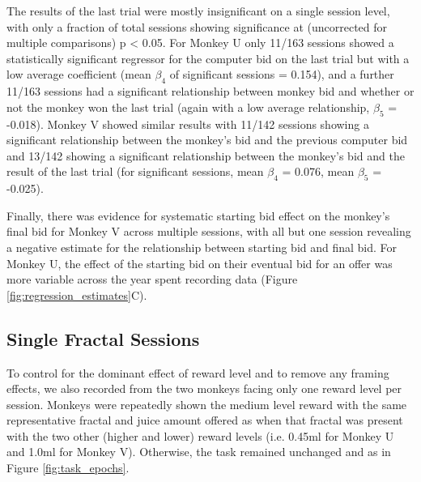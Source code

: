 The results of the last trial were mostly insignificant on a single session level, with only a fraction of total sessions showing significance at (uncorrected for multiple comparisons) p < 0.05. For Monkey U only 11/163 sessions showed a statistically significant regressor for the computer bid on the last trial but with a low average coefficient (mean $\beta_4$ of significant sessions = 0.154), and a further 11/163 sessions had a significant relationship between monkey bid and whether or not the monkey won the last trial (again with a low average relationship, $\beta_5$ = -0.018). Monkey V showed similar results with 11/142 sessions showing a significant relationship between the monkey’s bid and the previous computer bid and 13/142 showing a significant relationship between the monkey’s bid and the result of the last trial (for significant sessions, mean $\beta_4$ = 0.076, mean $\beta_5$ = -0.025).

Finally, there was evidence for systematic starting bid effect on the monkey’s final bid for Monkey V across multiple sessions, with all but one session revealing a negative estimate for the relationship between starting bid and final bid. For Monkey U, the effect of the starting bid on their eventual bid for an offer was more variable across the year spent recording data (Figure \ref{fig:regression_estimates}C).

\subsection{Single Fractal Sessions}

To control for the dominant effect of reward level and to remove any framing effects, we also recorded from the two monkeys facing only one reward level per session. Monkeys were repeatedly shown the medium level reward with the same representative fractal and juice amount offered as when that fractal was present with the two other (higher and lower) reward levels (i.e. 0.45ml for Monkey U and 1.0ml for Monkey V). Otherwise, the task remained unchanged and as in Figure \ref{fig:task_epochs}.

